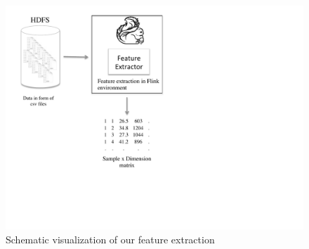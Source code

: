 \documentclass{vldb}
\begin{document}
\begin{figure}
\centering
\includegraphics[trim=1cm 4cm 8cm 0.5cm, clip=true, width=1.2\linewidth]{"pics/approach1"}
\caption{Schematic visualization of our feature extraction}
\label{fig:approach-1}
\end{figure}
\end{document}
